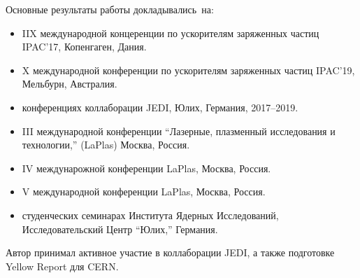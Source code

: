 {\probation}
Основные результаты работы докладывались~на:
\begin{itemize}
\item IIX международной концеренции по ускорителям заряженных частиц IPAC'17, Копенгаген, Дания.
\item X международной конференции по ускорителям заряженных частиц IPAC'19, Мельбурн, Австралия.
\item конференциях коллаборации JEDI, Юлих, Германия, 2017--2019.
\item III международной конференции ``Лазерные, плазменный исследования и технологии,'' (LaPlas) Москва, Россия. 
\item IV междунарожной конференции LaPlas, Москва, Россия.
\item V международной конференции LaPlas, Москва, Россия.
\item студенческих семинарах Института Ядерных Исследований, Исследовательский Центр ``Юлих,'' Германия.
\end{itemize}

{\contribution} Автор принимал активное участие в коллаборации JEDI, а также подготовке Yellow Report для CERN.


